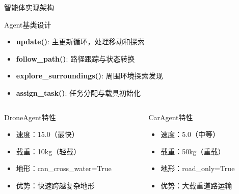 \documentclass[
10pt,
aspectratio=169,
]{beamer}
\begin{document}
\begin{frame}{智能体实现架构}
    \begin{block}{Agent基类设计}%
        \begin{itemize}
            \item \textbf{update()}: 主更新循环，处理移动和探索
            \item \textbf{follow\_path()}: 路径跟踪与状态转换
            \item \textbf{explore\_surroundings()}: 周围环境探索发现
            \item \textbf{assign\_task()}: 任务分配与载具初始化
        \end{itemize}
    \end{block}
    
    \begin{columns}
        \begin{column}{0.5\textwidth}
            \begin{alertblock}{DroneAgent特性}
                \begin{itemize}
                    \item 速度：15.0（最快）
                    \item 载重：10kg（轻载）
                    \item 地形：can\_cross\_water=True
                    \item 优势：快速跨越复杂地形
                \end{itemize}
            \end{alertblock}
        \end{column}
        \begin{column}{0.5\textwidth}
            \begin{alertblock}{CarAgent特性}
                \begin{itemize}
                    \item 速度：5.0（中等）
                    \item 载重：50kg（重载）
                    \item 地形：road\_only=True
                    \item 优势：大载重道路运输
                \end{itemize}
            \end{alertblock}
        \end{column}
    \end{columns}
\end{frame}
\end{document}
